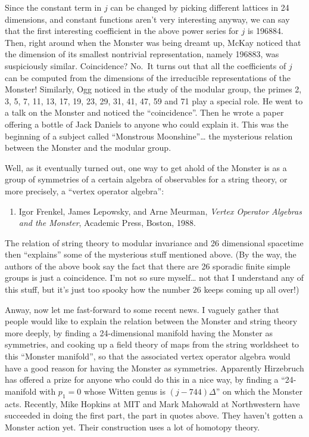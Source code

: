 \documentclass{article}
\def\tightlist{}
\begin{document}
Since the constant term in \(j\) can be changed by picking different
lattices in 24 dimensions, and constant functions aren't very
interesting anyway, we can say that the first interesting coefficient in
the above power series for \(j\) is 196884. Then, right around when the
Monster was being dreamt up, McKay noticed that the dimension of its
smallest nontrivial representation, namely 196883, was suspiciously
similar. Coincidence? No.~It turns out that all the coefficients of
\(j\) can be computed from the dimensions of the irreducible
representations of the Monster! Similarly, Ogg noticed in the study of
the modular group, the primes 2, 3, 5, 7, 11, 13, 17, 19, 23, 29, 31,
41, 47, 59 and 71 play a special role. He went to a talk on the Monster
and noticed the ``coincidence''. Then he wrote a paper offering a bottle
of Jack Daniels to anyone who could explain it. This was the beginning
of a subject called ``Monstrous Moonshine''\ldots{} the mysterious
relation between the Monster and the modular group.

Well, as it eventually turned out, one way to get ahold of the Monster
is as a group of symmetries of a certain algebra of observables for a
string theory, or more precisely, a ``vertex operator algebra'':

\begin{enumerate}
\def\labelenumi{\arabic{enumi})}
\setcounter{enumi}{4}
\tightlist
\item
  Igor Frenkel, James Lepowsky, and Arne Meurman, \emph{Vertex Operator
  Algebras and the Monster}, Academic Press, Boston, 1988.
\end{enumerate}

The relation of string theory to modular invariance and 26 dimensional
spacetime then ``explains'' some of the mysterious stuff mentioned
above. (By the way, the authors of the above book say the fact that
there are 26 sporadic finite simple groups is just a coincidence. I'm
not so sure myself\ldots{} not that I understand any of this stuff, but
it's just too spooky how the number 26 keeps coming up all over!)

Anway, now let me fast-forward to some recent news. I vaguely gather
that people would like to explain the relation between the Monster and
string theory more deeply, by finding a 24-dimensional manifold having
the Monster as symmetries, and cooking up a field theory of maps from
the string worldsheet to this ``Monster manifold'', so that the
associated vertex operator algebra would have a good reason for having
the Monster as symmetries. Apparently Hirzebruch has offered a prize for
anyone who could do this in a nice way, by finding a ``24-manifold with
\(p_1=0\) whose Witten genus is \((j-744)\Delta\)'' on which the Monster
acts. Recently, Mike Hopkins at MIT and Mark Mahowald at Northwestern
have succeeded in doing the first part, the part in quotes above. They
haven't gotten a Monster action yet. Their construction uses a lot of
homotopy theory.
\end{document}
